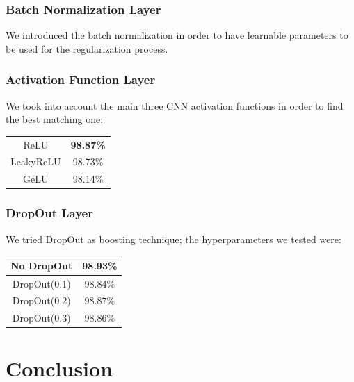 \documentclass[conference,compsoc]{IEEEtran}
\begin{document}
\subsubsection{Batch Normalization Layer} We introduced the batch normalization in order to have learnable parameters to be used for the regularization process.

\subsubsection{Activation Function Layer} We took into account the main three CNN activation functions in order to find the best matching one:
\begin{center}
\begin{tabular}{ c c }
\hline\hline
 ReLU & \textbf{98.87\%}  \\  
 LeakyReLU & 98.73\%  \\
 GeLU & 98.14\% \\
\hline\hline
\end{tabular}
\end{center}

\subsubsection{DropOut Layer} We tried DropOut as boosting technique; the hyperparameters we tested were:
\begin{center}
\begin{tabular}{ c c }
\hline\hline
 No DropOut & \textbf{98.93\%} \\ 
\hline
 DropOut(0.1) & 98.84\%  \\  
 DropOut(0.2) & 98.87\%  \\
 DropOut(0.3) & 98.86\% \\
\hline\hline
\end{tabular}
\end{center}

\section{Conclusion}
\end{document}
